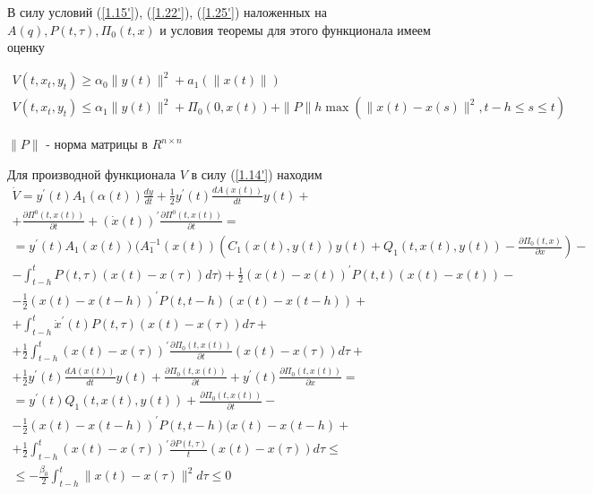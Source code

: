 В силу условий (\ref{1.15'}), (\ref{1.22'}), (\ref{1.25'}) наложенных на $A(q), P(t, \tau), \Pi_0(t, x)$ и условия теоремы для этого функционала имеем оценку

$$
\begin{array}{c}
	V(t, x_t, y_t) \ge \alpha_0 \| y(t) \|^2 + a_1 (\| x(t) \|)\\
	V(t, x_t, y_t) \le \alpha_1 \| y(t) \|^2 + \Pi_0 (0, x(t)) + \| P \| h \max (\| x(t) - x(s) \|^2, t-h \le s \le t)
\end{array}
$$

$\| P \|$ - норма матрицы в $R^{n \times n}$

Для производной функционала $V$ в силу (\ref{1.14'}) находим
$$
\begin{array}{c}
\displaystyle \dot V = y^{'} (t) A_1 (\alpha(t)) \frac{dy}{dt} + \frac12 y^{'} (t) \frac{d A(x(t))}{dt} y(t) +\\+
\displaystyle \frac{\partial \Pi^0 (t, x(t))}{\partial t} + (\dot x (t))^{'} \frac{\partial \Pi^0 (t, x(t))}{\partial t} =\\
\displaystyle = y^{'} (t) A_1 (x(t)) ( A_1^{-1} (x(t)) (C_1 (x(t), y(t)) y(t) + Q_1 (t, x(t), y(t)) - \frac{\partial \Pi_0 (t, x)}{\partial x}) -\\
\displaystyle - \int_{t - h}^{t} P(t, \tau) (x(t) - x(\tau)) d \tau) + \frac12 (x(t) - x(t))^{'} P(t, t) (x(t) - x(t)) -\\
\displaystyle - \frac12 (x(t) - x(t - h))^{'} P(t, t - h) (x(t) - x(t - h)) +\\
\displaystyle + \int_{t - h}^{t} \dot x^{'} (t) P(t, \tau) (x(t) - x(\tau)) d \tau +\\
\displaystyle + \frac12 \int_{t-h}^{t} (x(t) - x(\tau))^{'} \frac{\partial \Pi_0 (t, x(t))}{\partial t} (x(t) - x(\tau)) d \tau +\\
\displaystyle + \frac12 y^{'}(t) \frac{d A(x(t))}{dt} y(t) + \frac{\partial \Pi_0 (t, x(t))}{\partial t} + y^{'}(t) \frac{\partial \Pi_0 (t, x(t))}{\partial x} =\\
\displaystyle = y^{'} (t) Q_1 (t, x(t), y(t)) + \frac{\partial \Pi_0 (t, x(t))}{\partial t} -\\
\displaystyle - \frac12 (x(t) - x(t - h))^{'} P (t, t - h) (x(t) - x(t - h) +\\
\displaystyle + \frac12 \int_{t - h}^{t} (x(t) - x(\tau))^{'} \frac{\partial P(t, \tau)}{t} (x(t) - x(\tau)) d \tau \le\\
\displaystyle \le - \frac{\beta_0}{2} \int_{t-h}^{t} \| x(t) - x(\tau) \|^2 d \tau \le 0
\end{array}
$$

